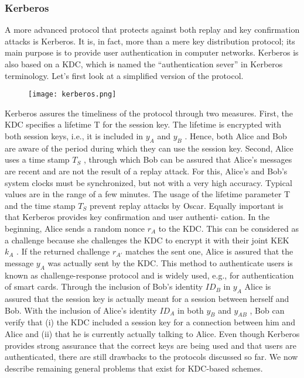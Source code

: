 \documentclass{article}
\begin{document}
\subsubsection{Kerberos}
A more advanced protocol that protects against both replay and key confirmation
attacks is Kerberos. It is, in fact, more than a mere key distribution protocol; its
main purpose is to provide user authentication in computer networks. Kerberos is also based on a KDC, which is named the “authentication sever” in Kerberos terminology. Let’s
first look at a simplified version of the protocol.
\begin{figure} [H]
    \centering
    \texttt{[image: kerberos.png]}
\end{figure}
Kerberos assures the timeliness of the protocol through two measures. First, the
KDC specifies a lifetime T for the session key. The lifetime is encrypted with both
session keys, i.e., it is included in $y_A$ and $y_B$ . Hence, both Alice and Bob are aware
of the period during which they can use the session key. Second, Alice uses a time
stamp $T_S$ , through which Bob can be assured that Alice’s messages are recent and
are not the result of a replay attack. For this, Alice’s and Bob’s system clocks must
be synchronized, but not with a very high accuracy. Typical values are in the range
of a few minutes. The usage of the lifetime parameter T and the time stamp $T_S$
prevent replay attacks by Oscar.
Equally important is that Kerberos provides key confirmation and user authenti-
cation. In the beginning, Alice sends a random nonce $r_A$ to the KDC. This can be
considered as a challenge because she challenges the KDC to encrypt it with their
joint KEK $k_A$ . If the returned challenge $r_{A'}$ matches the sent one, Alice is assured that
the message $y_A$ was actually sent by the KDC. This method to authenticate users is
known as challenge-response protocol and is widely used, e.g., for authentication of
smart cards.
Through the inclusion of Bob’s identity $ID_B$ in $y_A$ Alice is assured that the session
key is actually meant for a session between herself and Bob. With the inclusion of
Alice’s identity $ID_A$ in both $y_B$ and $y_{AB}$ , Bob can verify that (i) the KDC included
a session key for a connection between him and Alice and (ii) that he is currently
actually talking to Alice.
\newline
Even though Kerberos provides strong assurance that the correct keys are being
used and that users are authenticated, there are still drawbacks to the protocols discussed so far. We now describe remaining general problems that exist for KDC-based schemes.
\end{document}
